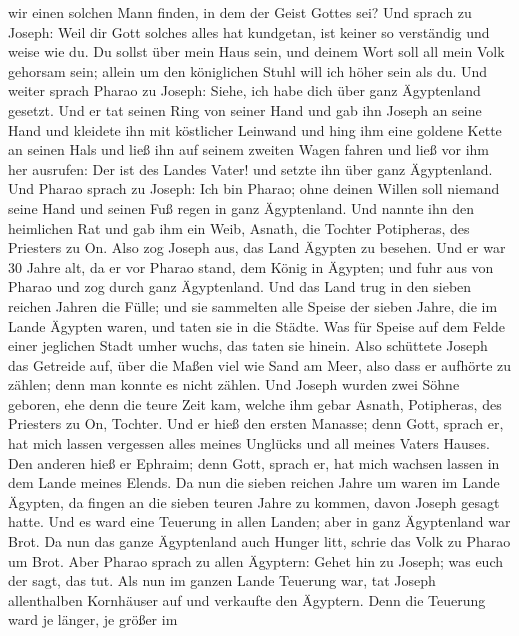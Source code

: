 wir einen solchen Mann finden, in dem der Geist Gottes sei?
 Und sprach zu Joseph: Weil dir Gott solches alles hat
kundgetan, ist keiner so verständig und weise wie du.  Du
sollst über mein Haus sein, und deinem Wort soll all mein Volk gehorsam
sein; allein um den königlichen Stuhl will ich höher sein als du.
 Und weiter sprach Pharao zu Joseph: Siehe, ich habe dich
über ganz Ägyptenland gesetzt.  Und er tat seinen Ring von
seiner Hand und gab ihn Joseph an seine Hand und kleidete ihn mit
köstlicher Leinwand und hing ihm eine goldene Kette an seinen Hals
 und ließ ihn auf seinem zweiten Wagen fahren und ließ vor
ihm her ausrufen: Der ist des Landes Vater! und setzte ihn über ganz
Ägyptenland.  Und Pharao sprach zu Joseph: Ich bin Pharao;
ohne deinen Willen soll niemand seine Hand und seinen Fuß regen in ganz
Ägyptenland.  Und nannte ihn den heimlichen Rat und gab ihm
ein Weib, Asnath, die Tochter Potipheras, des Priesters zu On. Also zog
Joseph aus, das Land Ägypten zu besehen.  Und er war 30
Jahre alt, da er vor Pharao stand, dem König in Ägypten; und fuhr aus
von Pharao und zog durch ganz Ägyptenland.  Und das Land
trug in den sieben reichen Jahren die Fülle;  und sie
sammelten alle Speise der sieben Jahre, die im Lande Ägypten waren, und
taten sie in die Städte. Was für Speise auf dem Felde einer jeglichen
Stadt umher wuchs, das taten sie hinein.  Also schüttete
Joseph das Getreide auf, über die Maßen viel wie Sand am Meer, also dass
er aufhörte zu zählen; denn man konnte es nicht zählen. 
Und Joseph wurden zwei Söhne geboren, ehe denn die teure Zeit kam,
welche ihm gebar Asnath, Potipheras, des Priesters zu On, Tochter.
 Und er hieß den ersten Manasse; denn Gott, sprach er, hat
mich lassen vergessen alles meines Unglücks und all meines Vaters
Hauses.  Den anderen hieß er Ephraim; denn Gott, sprach er,
hat mich wachsen lassen in dem Lande meines Elends.  Da nun
die sieben reichen Jahre um waren im Lande Ägypten,  da
fingen an die sieben teuren Jahre zu kommen, davon Joseph gesagt hatte.
Und es ward eine Teuerung in allen Landen; aber in ganz Ägyptenland war
Brot.  Da nun das ganze Ägyptenland auch Hunger litt,
schrie das Volk zu Pharao um Brot. Aber Pharao sprach zu allen Ägyptern:
Gehet hin zu Joseph; was euch der sagt, das tut.  Als nun
im ganzen Lande Teuerung war, tat Joseph allenthalben Kornhäuser auf und
verkaufte den Ägyptern. Denn die Teuerung ward je länger, je größer im
